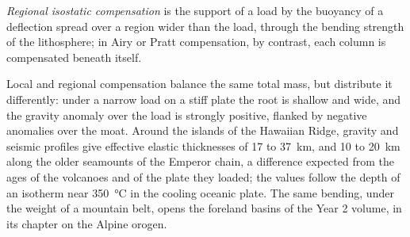 \begin{definition}\label{def:b3:gravity-geodesy:regional}
\emph{Regional isostatic compensation}
is the support of a load by the buoyancy of a deflection spread over a region
wider than the load, through the bending strength of the lithosphere; in Airy
or Pratt compensation, by contrast, each column is compensated beneath itself.
\end{definition}

Local and regional compensation balance the same total mass, but distribute it
differently: under a narrow load on a stiff plate the root is shallow and wide,
and the gravity anomaly over the load is strongly positive, flanked by negative
anomalies over the moat. Around the islands of the Hawaiian Ridge, gravity and
seismic profiles give effective elastic thicknesses of 17 to \qty{37}{km}, and
10 to \qty{20}{km} along the older seamounts of the Emperor chain, a difference
expected from the ages of the volcanoes and of the plate they loaded; the values
follow the depth of an isotherm near
\qty{350}{\degreeCelsius} in the cooling oceanic plate.
The same bending, under the weight of a mountain belt, opens the foreland
basins of the Year 2 volume, in its chapter on the Alpine orogen.

